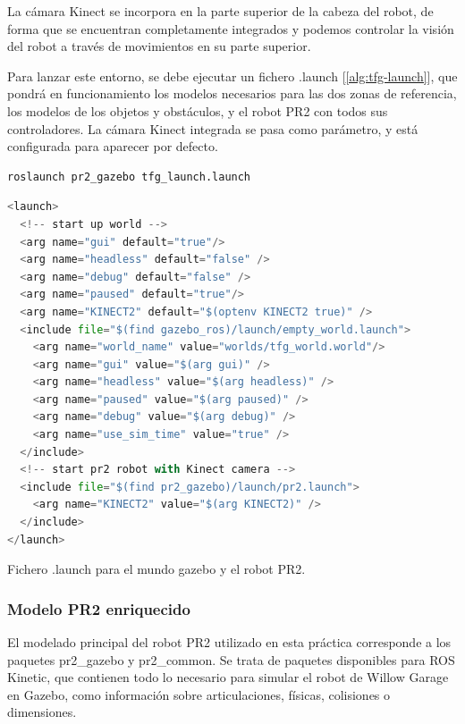 \documentclass[12pt,spanish,chapterprefix, numbers=noenddot]{book}
\numberwithin{equation}{section}
\numberwithin{figure}{section}
\begin{document}
La cámara Kinect se incorpora en la parte superior de la cabeza del robot, de forma que se encuentran completamente integrados y podemos controlar la visión del robot a través de movimientos en su parte superior.

Para lanzar este entorno, se debe ejecutar un fichero .launch [\ref{alg:tfg-launch}], que pondrá en funcionamiento los modelos necesarios para las dos zonas de referencia, los modelos de los objetos y obstáculos, y el robot PR2 con todos sus controladores. La cámara Kinect integrada se pasa como parámetro, y está configurada para aparecer por defecto.

\vspace{20pt}
	\begin{lstlisting}[frame=single]
roslaunch pr2_gazebo tfg_launch.launch
    \end{lstlisting}
    
\vspace{20pt}
\begin{algorithm}[htb!]
\begin{lstlisting}[breaklines=true,language=python]
<launch>
  <!-- start up world -->
  <arg name="gui" default="true"/>
  <arg name="headless" default="false" />
  <arg name="debug" default="false" />
  <arg name="paused" default="true"/>
  <arg name="KINECT2" default="$(optenv KINECT2 true)" />
  <include file="$(find gazebo_ros)/launch/empty_world.launch">
    <arg name="world_name" value="worlds/tfg_world.world"/> 
    <arg name="gui" value="$(arg gui)" />
    <arg name="headless" value="$(arg headless)" />
    <arg name="paused" value="$(arg paused)" />
    <arg name="debug" value="$(arg debug)" />
    <arg name="use_sim_time" value="true" />
  </include>
  <!-- start pr2 robot with Kinect camera -->
  <include file="$(find pr2_gazebo)/launch/pr2.launch">
    <arg name="KINECT2" value="$(arg KINECT2)" />
  </include>
</launch>
\end{lstlisting}

\caption{\label{alg:tfg-launch}Fichero .launch para el mundo gazebo y el robot PR2.}
\end{algorithm}

\subsubsection{Modelo PR2 enriquecido}
El modelado principal del robot PR2 utilizado en esta práctica corresponde a los paquetes pr2\_gazebo y pr2\_common. Se trata de paquetes disponibles para ROS Kinetic, que contienen todo lo necesario para simular el robot de Willow Garage en Gazebo, como  información sobre articulaciones, físicas, colisiones o dimensiones. 
\end{document}
